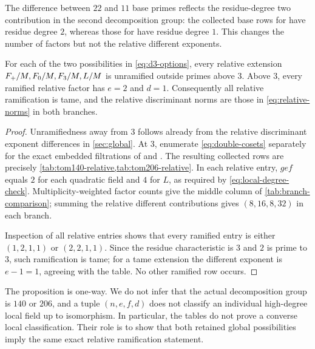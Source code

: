 The difference between $22$ and $11$ base primes reflects the residue-degree
two contribution in the second decomposition group: the collected base rows
for  have residue degree $2$, whereas those for  have
residue degree $1$.  This changes the number of factors but not the relative
different exponents.

\begin{proposition}
\label{prop:branch-independent}
For each of the two possibilities in \eqref{eq:d3-options}, every relative
extension $F_{+}/M,F_{0}/M,F_{3}/M,L/M$ is unramified outside primes
above $3$.  Above $3$, every ramified relative factor has $e=2$ and $d=1$.
Consequently all relative ramification is tame, and the relative
discriminant norms are those in \eqref{eq:relative-norms} in both branches.
\end{proposition}

\begin{proof}
Unramifiedness away from $3$ follows already from the relative discriminant
exponent differences in \cref{sec:global}.  At $3$, enumerate
\eqref{eq:double-cosets} separately for the exact embedded filtrations of
 and .  The resulting collected rows are precisely
\cref{tab:tom140-relative,tab:tom206-relative}.  In each relative entry,
$g e f$ equals $2$ for each quadratic field and $4$ for $L$, as required by
\eqref{eq:local-degree-check}.  Multiplicity-weighted factor
counts give the middle column of \cref{tab:branch-comparison}; summing the
relative different contributions gives $(8,16,8,32)$ in each branch.

Inspection of all relative entries shows that every ramified entry is either
$(1,2,1,1)$ or $(2,2,1,1)$.  Since the residue characteristic is $3$ and
$2$ is prime to $3$, such ramification is tame; for a tame extension the
different exponent is $e-1=1$, agreeing with the table.  No other ramified
row occurs.
\end{proof}

The proposition is one-way.  We do not infer that the actual decomposition
group is $140$ or $206$, and a tuple $(n,e,f,d)$ does not classify an
individual high-degree local field up to isomorphism.  In particular, the
tables do not prove a converse local classification.  Their role is to show
that both retained global possibilities imply the same exact relative
ramification statement.
